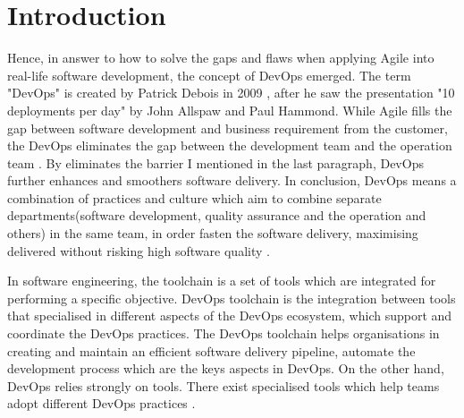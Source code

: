 \chapter{Introduction}
\label{chp:introduction}
\par
Hence, in answer to how to solve the gaps and flaws when applying Agile into real-life software development, the concept of DevOps emerged. The term "DevOps" is created by Patrick Debois in 2009 \cite{kim2016devops}, after he saw the presentation "10 deployments per day" by John Allspaw and Paul Hammond. While Agile fills the gap between software development and business requirement from the customer, the DevOps eliminates the gap between the development team and the operation team \cite{WhatisaD20:online}. By eliminates the barrier I mentioned in the last paragraph, DevOps further enhances and smoothers software delivery. In conclusion, DevOps means a combination of practices and culture which aim to combine separate departments(software development, quality assurance and the operation and others) in the same team, in order fasten the software delivery, maximising delivered without risking high software quality \cite{DevOpsWi87:online}\cite{ebert2016devops}.
\par
In software engineering, the toolchain is a set of tools which are integrated for performing a specific objective. DevOps toolchain is the integration between tools that specialised in different aspects of the DevOps ecosystem, which support and coordinate the DevOps practices. The DevOps toolchain helps organisations in creating and maintain an efficient software delivery pipeline, automate the development process \cite{DevOpsto7:online} which are the keys aspects in DevOps. On the other hand, DevOps relies strongly on tools. There exist specialised tools which help teams adopt different DevOps practices \cite{zhu2016devops}. 

